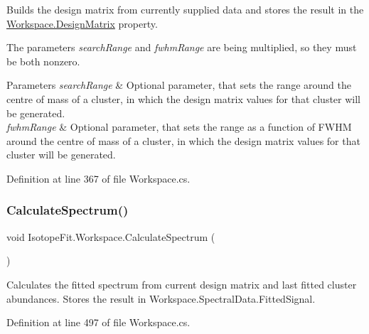 Builds the design matrix from currently supplied data and stores the result in the \mbox{\hyperlink{class_isotope_fit_1_1_workspace_ae24a2ee8f965fb2ed7ad3a592163271d}{Workspace.\+Design\+Matrix}} property. 

The parameters {\itshape search\+Range}  and {\itshape fwhm\+Range}  are being multiplied, so they must be both nonzero.


\begin{DoxyParams}{Parameters}
{\em search\+Range} & Optional parameter, that sets the range around the centre of mass of a cluster, in which the design matrix values for that cluster will be generated.\\
\hline
{\em fwhm\+Range} & Optional parameter, that sets the range as a function of F\+W\+HM around the centre of mass of a cluster, in which the design matrix values for that cluster will be generated.\\
\hline
\end{DoxyParams}


Definition at line 367 of file Workspace.\+cs.

\mbox{\label{class_isotope_fit_1_1_workspace_af0793a9feb68a36f8f9df8ac3e1a305b}} 
\subsubsection{\texorpdfstring{Calculate\+Spectrum()}{CalculateSpectrum()}}
{\footnotesize\ttfamily void Isotope\+Fit.\+Workspace.\+Calculate\+Spectrum (\begin{DoxyParamCaption}{ }\end{DoxyParamCaption})}



Calculates the fitted spectrum from current design matrix and last fitted cluster abundances. Stores the result in Workspace.\+Spectral\+Data.\+Fitted\+Signal. 



Definition at line 497 of file Workspace.\+cs.

\mbox{\label{class_isotope_fit_1_1_workspace_aa0b81213937d49ae3a6183563cfe0f60}} 
